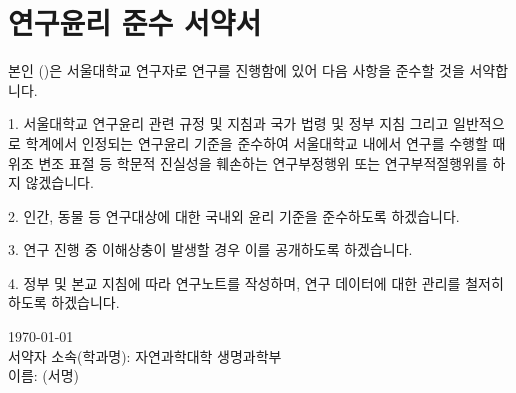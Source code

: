 \chapter*{연구윤리 준수 서약서}
\thispagestyle{empty}
\doublespacing
\makeatletter

본인 (\@author)은 서울대학교 연구자로 연구를 진행함에 있어 다음 사항을 준수할 것을 서약합니다.

1. 서울대학교 연구윤리 관련 규정 및 지침과 국가 법령 및 정부 지침 그리고 일반적으로 학계에서 인정되는 연구윤리 기준을 준수하여 서울대학교 내에서 연구를 수행할 때 위조 변조 표절 등 학문적 진실성을 훼손하는 연구부정행위 또는 연구부적절행위를 하지 않겠습니다.

2. 인간, 동물 등 연구대상에 대한 국내외 윤리 기준을 준수하도록 하겠습니다.

3. 연구 진행 중 이해상충이 발생할 경우 이를 공개하도록 하겠습니다.

4. 정부 및 본교 지침에 따라 연구노트를 작성하며, 연구 데이터에 대한 관리를 철저히 하도록 하겠습니다.

\begin{center}
  \today \\
  서약자 소속(학과명): 자연과학대학 생명과학부 \\
  이름: \quad \@author \quad (서명) \\
\end{center}
\makeatother
